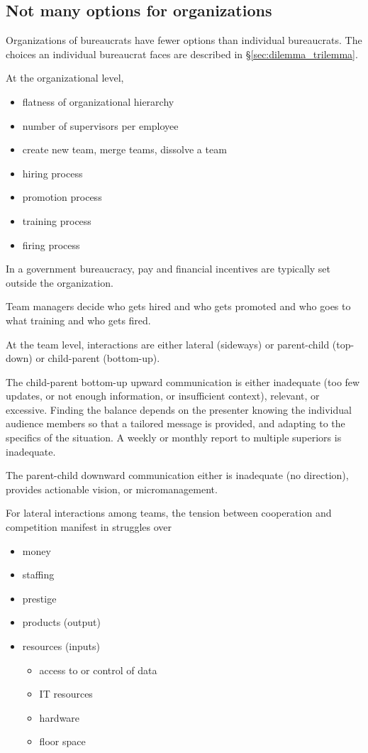 \subsection{Not many options for organizations}

Organizations of bureaucrats have fewer options than individual bureaucrats. The choices an individual bureaucrat faces are described in \S\ref{sec:dilemma_trilemma}.

At the organizational level, 
\begin{itemize}
    \item flatness of organizational hierarchy
    \item number of supervisors per employee
    \item create new team, merge teams, dissolve a team
    \item hiring process 
    \item promotion process 
    \item training process
    \item firing process
\end{itemize}
In a government bureaucracy, pay and financial incentives are typically set outside the organization.


Team managers decide who gets hired and who gets promoted and who goes to what training and who gets fired.

At the team level, interactions are either lateral (sideways) or parent-child (top-down) or child-parent (bottom-up).
\cite{2014_Jorgensen}

The child-parent bottom-up upward communication is either inadequate (too few updates, or not enough information, or insufficient context), relevant, or excessive. Finding the balance depends on the presenter knowing the individual audience members so that a tailored message is provided, and adapting to the specifics of the situation. A weekly or monthly report to multiple superiors is inadequate. 

The parent-child downward communication either is inadequate (no direction), provides actionable vision, or micromanagement. 

For lateral interactions among teams, the tension between cooperation and competition manifest in struggles over
\begin{itemize}
    \item money
    \item staffing
    \item prestige
    \item products (output)
    \item resources (inputs)
    \begin{itemize}
        \item access to or control of data
        \item IT resources
        \item hardware
        \item floor space
    \end{itemize}
\end{itemize}
